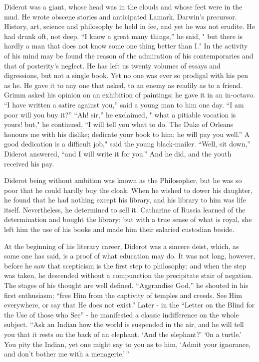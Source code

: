 \documentclass[]{book}
\begin{document}
Diderot was a giant, whose head was in the clouds and whose feet were in
the mud. He wrote obscene stories and anticipated Lamark, Darwin's
precursor. History, art, science and philosophy he held in fee, and yet
he was not erudite. He had drunk oft, not deep. ``I know a great many
things,'' he said, " but there is hardly a man that does not know some
one thing better than I." In the activity of his mind may be found the
reason of the admiration of his contemporaries and that of posterity's
neglect. He has left us twenty volumes of essays and digressions, but
not a single book. Yet no one was ever so prodigal with his pen as he.
He gave it to any one that asked, to an enemy as readily as to a friend.
Grimm asked his opinion on an exhibition of paintings; he gave it in an
in-octavo. ``I have written a satire against you,'' said a young man to
him one day. ``I am poor will you buy it?'' ``Ah! sir,'' he exclaimed, "
what a pitiable vocation is yours! but," he continued, ``I will tell you
what to do. The Duke of Orleans honours me with his dislike; dedicate
your book to him; he will pay you well.'' A good dedication is a
difficult job," said the young black-mailer. ``Well, sit down,'' Diderot
answered, ``and I will write it for you.'' And he did, and the youth
received his pay.

Diderot being without ambition was known as the Philosopher, but he was
so poor that he could hardly buy the cloak. When he wished to dower his
daughter, he found that he had nothing except his library, and his
library to him was life itself. Nevertheless, he determined to sell it.
Catharine of Russia learned of the determination and bought the library;
but with a true sense of what is royal, she left him the use of his
books and made him their salaried custodian beside.

At the beginning of his literary career, Diderot was a sincere deist,
which, as some one has said, is a proof of what education may do. It was
not long, however, before he saw that scepticism is the first step to
philosophy; and when the step was taken, he descended without a
compunction the precipitate stair of negation. The stages of his thought
are well defined. ``Aggrandise God,'' he shouted in his first
enthusiasm; ``free Him from the captivity of temples and creeds. See Him
everywhere, or say that He does not exist.'' Later - in the ``Letter on
the Blind for the Use of those who See'' - he manifested a classic
indifference on the whole subject. ``Ask an Indian how the world is
suspended in the air, and he will tell you that it rests on the back of
an elephant. `And the elephant?' `0n a turtle.' You pity the Indian, yet
one might say to you as to him, `Admit your ignorance, and don't bother
me with a menagerie.'\,''
\end{document}
